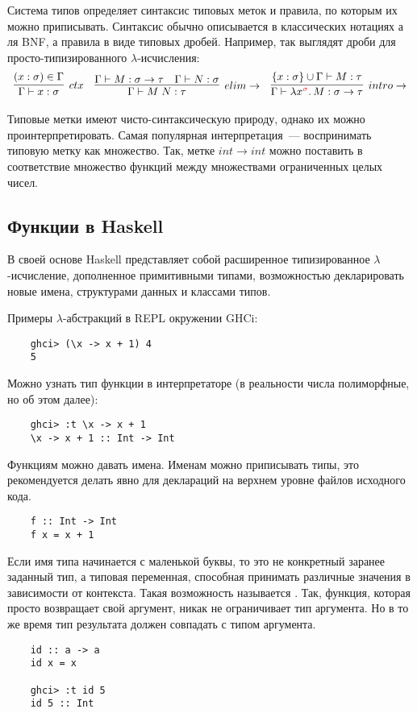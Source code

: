 Система типов определяет синтаксис типовых меток и правила, по которым их можно приписывать.
Синтаксис обычно описывается в классических нотациях а ля BNF, а правила в виде типовых дробей.
Например, так выглядят дроби для просто-типизированного $\lambda$-исчисления:
\[
    \begin{array}{l c r}
        \infer[ctx]{\Gamma \vdash x: \sigma}{(x: \sigma) \in \Gamma}
        &
        \infer[elim\to]{\Gamma \vdash M\;N : \tau}{\Gamma \vdash M : \sigma \to \tau & \Gamma \vdash N : \sigma}
        &
        \infer[intro\to]{\Gamma \vdash \lambda x^{\color{red} \sigma}\ldotp M : \sigma \to \tau}{\{x : \sigma\} \cup \Gamma \vdash M : \tau}
    \end{array}
\]

Типовые метки имеют чисто-синтаксическую природу, однако их можно проинтерпретировать.
Самая популярная интерпретация~--- воспринимать типовую метку как множество.
Так, метке $int \to int$ можно поставить в соответствие множество функций между множествами ограниченных целых чисел.

\subsection{Функции в Haskell}

В своей основе Haskell представляет собой расширенное типизированное $\lambda$-исчисление, дополненное примитивными типами, возможностью декларировать новые имена, структурами данных и классами типов.

Примеры $\lambda$-абстракций в REPL окружении GHCi:

\begin{verbatim}
    ghci> (\x -> x + 1) 4
    5
\end{verbatim}

Можно узнать тип функции в интерпретаторе (в реальности числа полиморфные, но об этом далее):
\begin{verbatim}
    ghci> :t \x -> x + 1
    \x -> x + 1 :: Int -> Int
\end{verbatim}

Функциям можно давать имена.
Именам можно приписывать типы, это рекомендуется делать явно для деклараций на верхнем уровне файлов исходного кода.
\begin{verbatim}
    f :: Int -> Int
    f x = x + 1
\end{verbatim}

Если имя типа начинается с маленькой буквы, то это не конкретный заранее заданный тип, а типовая переменная, способная принимать различные значения в зависимости от контекста.
Такая возможность называется .
Так, функция, которая просто возвращает свой аргумент, никак не ограничивает тип аргумента.
Но в то же время тип результата должен совпадать с типом аргумента.
\begin{verbatim}
    id :: a -> a
    id x = x

    ghci> :t id 5
    id 5 :: Int
\end{verbatim}

